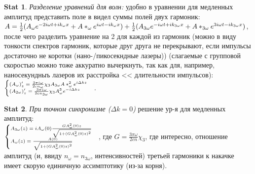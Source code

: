 \documentclass[a4paper,12pt]{article}
\theoremstyle{definition} %
\newtheorem{Stat}{Stat}[section]
\theoremstyle{definition} %
\theoremstyle{remark} %
\begin{document}
\begin{Stat}\label{stat \theStat}
	\textit{Разделение уравнений для волн:} удобно в уравнении для медленных амплитуд представить поле в видел суммы полей двух гармоник: $A = \frac{1}{2} (A_{\omega}e^{-2i\omega t +i k_{\omega}x} + A*_{\omega}e^{i\omega t -i k_{\omega}x}) + \\ \frac{1}{2} (A_{3\omega}e^{-i\omega t +i k_{3\omega}x} + A*_{3\omega}e^{3i\omega t -i k_{3\omega}x})$, после чего разделить уравнение на 2 для каждой из гармоник (можно в виду тонкости спектров гармоник, которые друг друга не перекрывают, если импульсы достаточно не коротки (нано-/пикосекндные лазеры)) (слагаемые с групповой скоростью можно тоже аккуратно вычеркнуть, так как для, например, наносекундныъ лазеров их расстройка << длительности импульсов): $\scriptsize
	\begin{cases}
		(A_{\omega})'_{z}=\frac{3\pi i \omega}{2cn_{\omega}} \chi_{3} A_{3\omega}A*_{\omega}^{2} e^{i \Delta k z} \\
		(A_{2\omega})'_{z}=\frac{3\pi i \omega}{2cn_{3\omega}} \chi_{3} A_{\omega}^{3} e^{- i \Delta k z} 
	\end{cases}$.
\end{Stat}
\begin{Stat}\label{stat \theStat}
	\textit{При точном синхронизме ($\Delta k = 0$)} решение ур-я для медленных амплитуд: \\$\scriptsize
	\begin{cases}
		A_{3\omega}(z)=iA_{\omega}(0)\frac{GA_{\omega}^{2}(0)z}{\sqrt{1+(GA_{\omega}^{2}(0)z)^{2}}} \\
		A_{\omega}(z)=\frac{A(0)}{\sqrt{1+(GA_{\omega}^{2}(0)z)^{2}}}
	\end{cases}$, где $G=\frac{3\pi \omega}{2cn}\chi_{3}$, где интересно, отношение амплитуд (и, ввиду $n_{\omega}=n_{3\omega}$, интенсивностей) третьей гармоники к накачке имеет скорую единичную ассимптотику (из-за корня).
\end{Stat}
\end{document}
